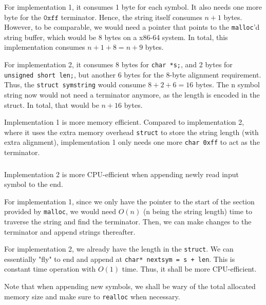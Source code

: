 \documentclass[12pt]{article}
\begin{document}
\subsubsection{}

For implementation 1, it consumes 1 byte for each symbol. It also needs one more byte for the $\mathtt{0xff}$ terminator. Hence, the string itself consumes $n + 1$ bytes. However, to be comparable, we would need a pointer that points to the \texttt{malloc}'d string buffer, which would be 8 bytes on a x86-64 system. In total, this implementation consumes $n + 1 + 8 = n + 9$ bytes.

For implementation 2, it consumes 8 bytes for \texttt{char *s;}, and 2 bytes for \texttt{unsigned short len;}, but another 6 bytes for the 8-byte alignment requirement. Thus, the \texttt{struct symstring} would consume $8 + 2 + 6 = 16$ bytes. The n symbol string now would not need a terminator anymore, as the length is encoded in the struct. In total, that would be $n + 16$ bytes.

Implementation 1 is more memory efficient. Compared to implementation 2, where it uses the extra memory overhead \texttt{struct} to store the string length (with extra alignment), implementation 1 only needs one more \texttt{char 0xff} to act as the terminator.

\subsubsection{}

Implementation 2 is more CPU-efficient when appending newly read input symbol to the end. 

For implementation 1, since we only have the pointer to the start of the section provided by \texttt{malloc}, we would need $O(n)$ (n being the string length) time to traverse the string and find the terminator. Then, we can make changes to the terminator and append strings thereafter.

For implementation 2, we already have the length in the \texttt{struct}. We can essentially "fly" to end and append at \texttt{char* nextsym = s + len}. This is constant time operation with $O(1)$ time. Thus, it shall be more CPU-efficient.

Note that when appending new symbols, we shall be wary of the total allocated memory size and make sure to \texttt{realloc} when necessary.

\subsubsection{}
\end{document}
